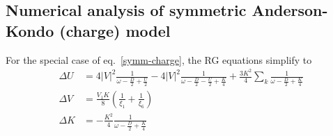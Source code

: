 \documentclass[12pt,twoside]{article}
\numberwithin{equation}{section}
\begin{document}
\subsection{Numerical analysis of symmetric Anderson-Kondo (charge) model}
For the special case of eq.~\ref{symm-charge}, the RG equations simplify to
\begin{equation}\begin{aligned}
	\Delta U &= 4|V|^2\frac{1}{\omega - \frac{D}{2} + \frac{U}{2}} - 4|V|^2\frac{1}{\omega - \frac{D}{2} - \frac{U}{2} + \frac{K}{4}} + \frac{3K^2}{4}\sum_k\frac{1}{\omega - \frac{D}{2} + \frac{K}{4}}\\
	\Delta V &= \frac{V_1 K}{8}\left( \frac{1}{\xi_1} + \frac{1}{\xi_6} \right) \\
	\Delta K &= -\frac{K^2}{4}\frac{1}{\omega - \frac{D}{2} + \frac{K}{4}}
\end{aligned}\end{equation}
\end{document}
